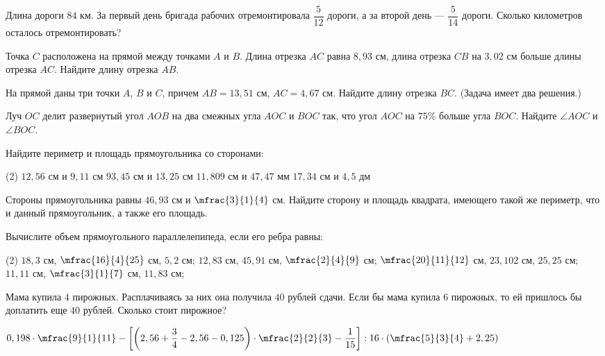 \begin{class}[number=2]
	\begin{listofex}
		\item Длина дороги \( 84 \) км. За первый день бригада рабочих отремонтировала \(\dfrac{ 5}{12} \) дороги, а за второй день --- \( \dfrac{5}{14} \) дороги. Сколько километров осталось отремонтировать?
		\item Точка \( C \) расположена на прямой между точками \( A \) и \( B \). Длина отрезка \( AC \) равна \( 8,93 \) см, длина отрезка \( CB \) на \( 3,02 \) см больше длины отрезка \( AC \). Найдите длину отрезка \( AB \).
		\item На прямой даны три точки \( A \), \( B \) и \( C \), причем \( AB=13,51 \) см, \( AC=4,67 \) см. Найдите длину отрезка \( BC \). (Задача имеет два решения.)
		\item Луч \( OC \) делит развернутый угол \( AOB \) на два смежных угла \( AOC \) и \( BOC \) так, что угол \( AOC \) на \( 75\% \) больше угла \( BOC \). Найдите \( \angle AOC \) и \( \angle BOC \).
		\item Найдите периметр и площадь прямоугольника со сторонами:\begin{tasks}(2)
			\task \( 12,56 \) см и \( 9,11 \) см
			\task \( 93,45 \) см и \( 13,25 \) см
			\task\( 11,809 \) см и \( 47,47 \) мм
			\task\( 17,34 \) см и \( 4,5 \) дм
		\end{tasks}
		\item Стороны прямоугольника равны \( 46,93 \) см и \( \mfrac{3}{1}{4} \) см. Найдите сторону и площадь квадрата, имеющего такой же периметр, что и данный прямоугольник, а также его площадь.
		\item Вычислите объем прямоугольного параллелепипеда, если его ребра равны:
		\begin{tasks}(2)
			\task \( 18,3 \) см, \( \mfrac{16}{4}{25} \) см, \( 5,2 \) см;
			\task  \( 12,83\) см, \( 45,91 \) см, \( \mfrac{2}{4}{9} \) см;
			\task  \( \mfrac{20}{11}{12} \) см, \( 23,102 \) см, \( 25,25 \) см;
			\task  \( 11,11 \) см, \( \mfrac{3}{1}{7} \) см, \( 11,83 \) см;
		\end{tasks}
		\item Мама купила \( 4 \) пирожных. Расплачиваясь за них она получила \( 40 \) рублей сдачи. Если бы мама купила \( 6 \) пирожных, то ей пришлось бы доплатить еще \( 40 \) рублей. Сколько стоит пирожное?
		\item \( 0,198\cdot\mfrac{9}{1}{11}-\left[ \left( 2,56+\dfrac{3}{4}-2,56-0,125 \right)\cdot\mfrac{2}{2}{3}-\dfrac{1}{15} \right]:16\cdot\left( \mfrac{5}{3}{4}+2,25 \right) \)
	\end{listofex}
\end{class}

